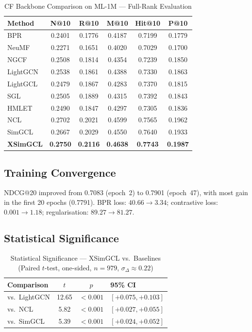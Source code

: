 \documentclass[conference]{IEEEtran}
\begin{document}
\begin{table}[h]
\caption{CF Backbone Comparison on ML-1M --- Full-Rank Evaluation}
\label{tab:ml1m}
\centering\scriptsize
\begin{tabular}{lccccc}
\toprule
\textbf{Method} & \textbf{N@10} & \textbf{R@10} & \textbf{M@10}
                & \textbf{Hit@10} & \textbf{P@10}\\
\midrule
BPR      & 0.2401 & 0.1776 & 0.4187 & 0.7199 & 0.1779\\
NeuMF    & 0.2271 & 0.1651 & 0.4020 & 0.7029 & 0.1700\\
NGCF     & 0.2508 & 0.1814 & 0.4354 & 0.7239 & 0.1850\\
LightGCN & 0.2538 & 0.1861 & 0.4388 & 0.7330 & 0.1863\\
LightGCL & 0.2479 & 0.1867 & 0.4283 & 0.7370 & 0.1815\\
SGL      & 0.2505 & 0.1889 & 0.4315 & 0.7392 & 0.1843\\
HMLET    & 0.2490 & 0.1847 & 0.4297 & 0.7305 & 0.1836\\
NCL      & 0.2702 & 0.2021 & 0.4599 & 0.7565 & 0.1962\\
SimGCL   & 0.2667 & 0.2029 & 0.4550 & 0.7640 & 0.1933\\
\midrule
\textbf{XSimGCL} & \textbf{0.2750} & \textbf{0.2116}
  & \textbf{0.4638} & \textbf{0.7743} & \textbf{0.1987}\\
\bottomrule
\end{tabular}
\end{table}

\subsection{Training Convergence}

NDCG@20 improved from 0.7083 (epoch~2) to 0.7901 (epoch~47), with most
gain in the first 20 epochs (0.7791).
BPR loss: $40.66\to3.34$; contrastive loss: $0.001\to1.18$;
regularisation: $89.27\to81.27$.

\subsection{Statistical Significance}

\begin{table}[h]
\caption{Statistical Significance --- XSimGCL vs.\ Baselines
(Paired $t$-test, one-sided, $n=979$, $\sigma_\Delta\approx0.22$)}
\label{tab:stats}
\centering\small
\begin{tabular}{lccl}
\toprule
\textbf{Comparison} & $t$ & $p$ & \textbf{95\% CI}\\
\midrule
vs.\ LightGCN & 12.65 & $<0.001$ & $[+0.075,+0.103]$\\
vs.\ NCL      & 5.82  & $<0.001$ & $[+0.027,+0.055]$\\
vs.\ SimGCL   & 5.39  & $<0.001$ & $[+0.024,+0.052]$\\
\bottomrule
\end{tabular}
\end{table}
\end{document}
